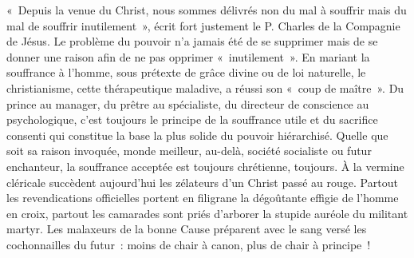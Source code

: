 \documentclass[french,twoside]{book} %
\newcommand{\astermono}{\medskip\centerline{\color{rubric}\large\selectfont{\syms ✻}}\medskip\par}%
\begin{document}
« Depuis la venue du Christ, nous sommes délivrés non du mal à souffrir mais du mal de souffrir inutilement », écrit fort justement le P. Charles de la Compagnie de Jésus. Le problème du pouvoir n’a jamais été de se supprimer mais de se donner une raison afin de ne pas opprimer « inutilement ». En mariant la souffrance à l’homme, sous prétexte de grâce divine ou de loi naturelle, le christianisme, cette thérapeutique maladive, a réussi son « coup de maître ». Du prince au manager, du prêtre au spécialiste, du directeur de conscience au psychologique, c’est toujours le principe de la souffrance utile et du sacrifice consenti qui constitue la base la plus solide du pouvoir hiérarchisé. Quelle que soit sa raison invoquée, monde meilleur, au-delà, société socialiste ou futur enchanteur, la souffrance acceptée est toujours chrétienne, toujours. À la vermine cléricale succèdent aujourd’hui les zélateurs d’un Christ passé au rouge. Partout les revendications officielles portent en filigrane la dégoûtante effigie de l’homme en croix, partout les camarades sont priés d’arborer la stupide auréole du militant martyr. Les malaxeurs de la bonne Cause préparent avec le sang versé les cochonnailles du futur : moins de chair à canon, plus de chair à principe !\par

\astermono
\end{document}
